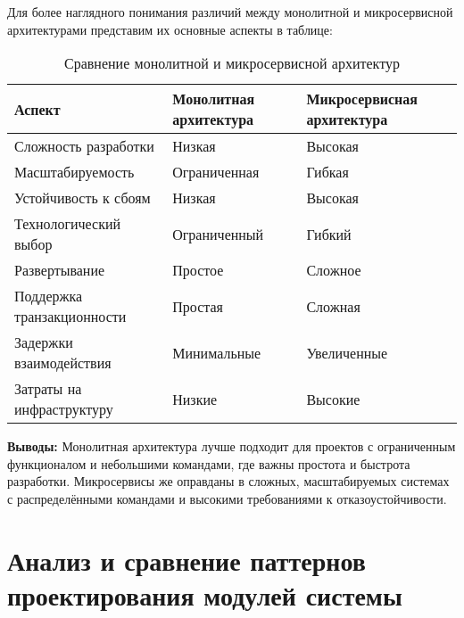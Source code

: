 Для более наглядного понимания различий между монолитной и микросервисной архитектурами представим их основные аспекты в таблице:

\begin{table}[H]
\centering
\begin{tabular}{|l|l|l|}
\hline
\textbf{Аспект}                & \textbf{Монолитная архитектура}       & \textbf{Микросервисная архитектура}   \\ \hline
Сложность разработки           & Низкая                                 & Высокая                                \\ \hline
Масштабируемость               & Ограниченная                           & Гибкая                                 \\ \hline
Устойчивость к сбоям           & Низкая                                 & Высокая                                \\ \hline
Технологический выбор          & Ограниченный                           & Гибкий                                 \\ \hline
Развертывание                  & Простое                                & Сложное                                \\ \hline
Поддержка транзакционности     & Простая                                & Сложная                                \\ \hline
Задержки взаимодействия        & Минимальные                            & Увеличенные                            \\ \hline
Затраты на инфраструктуру      & Низкие                                 & Высокие                                \\ \hline
\end{tabular}
\caption{Сравнение монолитной и микросервисной архитектур}
\end{table}

\textbf{Выводы:} Монолитная архитектура лучше подходит для проектов с ограниченным функционалом и небольшими командами, где важны простота и быстрота разработки. Микросервисы же оправданы в сложных, масштабируемых системах с распределёнными командами и высокими требованиями к отказоустойчивости.













\section{Анализ и сравнение паттернов проектирования модулей системы}

